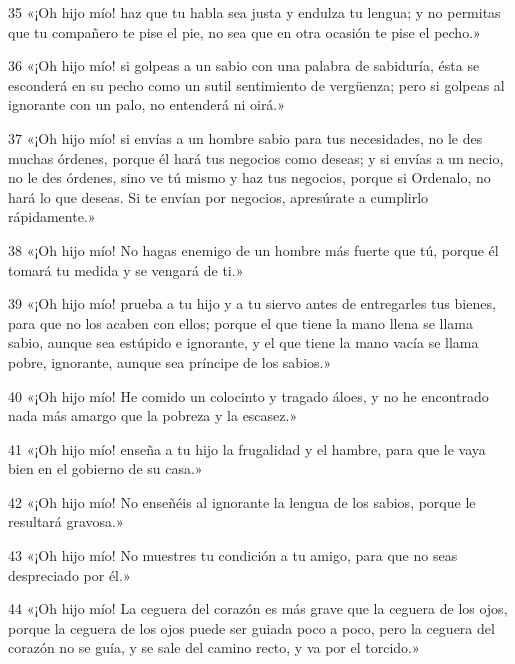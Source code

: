 \par 35 «¡Oh hijo mío! haz que tu habla sea justa y endulza tu lengua; y no permitas que tu compañero te pise el pie, no sea que en otra ocasión te pise el pecho.»

\par 36 «¡Oh hijo mío! si golpeas a un sabio con una palabra de sabiduría, ésta se esconderá en su pecho como un sutil sentimiento de vergüenza; pero si golpeas al ignorante con un palo, no entenderá ni oirá.»

\par 37 «¡Oh hijo mío! si envías a un hombre sabio para tus necesidades, no le des muchas órdenes, porque él hará tus negocios como deseas; y si envías a un necio, no le des órdenes, sino ve tú mismo y haz tus negocios, porque si Ordenalo, no hará lo que deseas. Si te envían por negocios, apresúrate a cumplirlo rápidamente.»

\par 38 «¡Oh hijo mío! No hagas enemigo de un hombre más fuerte que tú, porque él tomará tu medida y se vengará de ti.»

\par 39 «¡Oh hijo mío! prueba a tu hijo y a tu siervo antes de entregarles tus bienes, para que no los acaben con ellos; porque el que tiene la mano llena se llama sabio, aunque sea estúpido e ignorante, y el que tiene la mano vacía se llama pobre, ignorante, aunque sea príncipe de los sabios.»

\par 40 «¡Oh hijo mío! He comido un colocinto y tragado áloes, y no he encontrado nada más amargo que la pobreza y la escasez.»

\par 41 «¡Oh hijo mío! enseña a tu hijo la frugalidad y el hambre, para que le vaya bien en el gobierno de su casa.»

\par 42 «¡Oh hijo mío! No enseñéis al ignorante la lengua de los sabios, porque le resultará gravosa.»

\par 43 «¡Oh hijo mío! No muestres tu condición a tu amigo, para que no seas despreciado por él.»

\par 44 «¡Oh hijo mío! La ceguera del corazón es más grave que la ceguera de los ojos, porque la ceguera de los ojos puede ser guiada poco a poco, pero la ceguera del corazón no se guía, y se sale del camino recto, y va por el torcido.»

